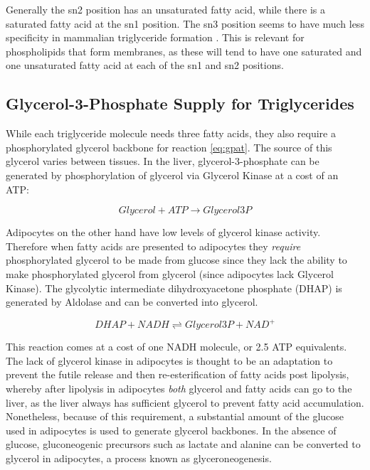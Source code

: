 \documentclass{tufte-handout}
\begin{document}
  Generally the sn2 position has an unsaturated fatty acid, while there is a saturated fatty acid at the sn1 position.  The sn3 position seems to have much less specificity in mammalian triglyceride formation \citep{Brockerhoff1971}.  This is relevant for phospholipids that form membranes, as these will tend to have one saturated and one unsaturated fatty acid at each of the sn1 and sn2 positions.  

\subsection{Glycerol-3-Phosphate Supply for Triglycerides}

While each triglyceride molecule needs three fatty acids, they also require a phosphorylated glycerol backbone for reaction \ref{eq:gpat}.  The source of this glycerol varies between tissues.  In the liver, glycerol-3-phosphate can be generated by phosphorylation of glycerol via Glycerol Kinase at a cost of an ATP:

\begin{equation}
Glycerol + ATP \rightarrow Glycerol3P
\end{equation}


Adipocytes on the other hand have low levels of glycerol kinase activity.  Therefore when fatty acids are presented to adipocytes they \emph{require} phosphorylated glycerol to be made from glucose since they lack the ability to make phosphorylated glycerol from glycerol (since adipocytes lack Glycerol Kinase).  The glycolytic intermediate dihydroxyacetone phosphate (DHAP) is generated by Aldolase and can be converted into glycerol.

\begin{equation}\label{eq:g3pdh}
DHAP + NADH \rightleftharpoons Glycerol3P + NAD^+
\end{equation}


This reaction comes at a cost of one NADH molecule, or 2.5 ATP equivalents. The lack of glycerol kinase in adipocytes is thought to be an adaptation to prevent the futile release and then re-esterification of fatty acids post lipolysis, whereby after lipolysis in adipocytes \emph{both} glycerol and fatty acids can go to the liver, as the liver always has sufficient glycerol to prevent fatty acid accumulation. Nonetheless, because of this requirement, a substantial amount of the glucose used in adipocytes is used to generate glycerol backbones. In the absence of glucose, gluconeogenic precursors such as lactate and alanine can be converted to glycerol in adipocytes, a process known as glyceroneogenesis.
\end{document}
